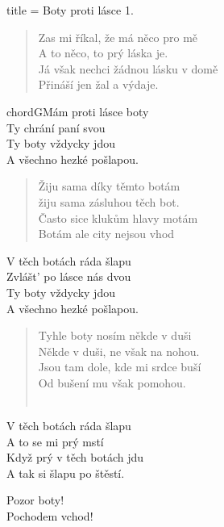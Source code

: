 \begin{song}{title = Boty proti lásce}
\textsc{1.} 
\begin{verse}
Zas mi říkal, že má něco pro mě \\
A to něco, to prý láska je. \\
Já však nechci žádnou lásku v domě  \\
Přináší jen žal a výdaje. \\
\end{verse}

\begin{chorus}
chord{G}Mám proti lásce boty \\
Ty chrání paní svou \\
Ty boty vždycky jdou  \\
A všechno hezké pošlapou. \\
\end{chorus}

\begin{verse}
Žiju sama díky těmto botám \\
žiju sama zásluhou těch bot. \\
Často sice klukům hlavy motám \\
Botám ale city nejsou vhod \\
\end{verse}

\begin{chorus}
V těch botách ráda šlapu  \\
Zvlášt' po lásce nás dvou \\
Ty boty vždycky jdou \\
A všechno hezké pošlapou. \\
\end{chorus}

\begin{verse}
Tyhle boty nosím někde v duši \\
Někde v duši, ne však na nohou. \\
Jsou tam dole, kde mi srdce buší \\
Od bušení mu však pomohou. \\
\\
\end{verse}

\begin{chorus}
V těch botách ráda šlapu \\
A to se mi prý mstí \\
Když prý v těch botách jdu \\
A tak si šlapu po štěstí. \\
\end{chorus}

Pozor boty! \\
Pochodem vchod! \\
\end{song}
